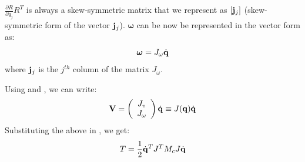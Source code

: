$\frac{\partial R}{\partial q_j}R^T$ is always a skew-symmetric matrix that we represent as $[\mathbf{j}_{j}]$ (skew-symmetric form of the vector $\mathbf{j}_j$). $\bm{\omega}$ can be now be represented in the vector form as:
\begin{equation}
\label{eq:velang}
\bm{\omega} = J_{\omega} \dot{\mathbf{q}}
\end{equation}
where $\mathbf{j}_{j}$ is the $j^{th}$ column of the matrix $J_{\omega}$.

Using  and , we can write:
\begin{equation}
\label{eq:velcartall}
\mathbf{V} = \left(
\begin{array}{c}
J_v \\
J_{\omega}
\end{array}
\right) \dot{\mathbf{q}} \equiv J(\mathbf{q})\dot{\mathbf{q}}
\end{equation}
Substituting the above in , we get:
\begin{equation}
T = \frac{1}{2}\dot{\mathbf{q}}^T J^T M_c J \dot{\mathbf{q}}
\end{equation}

